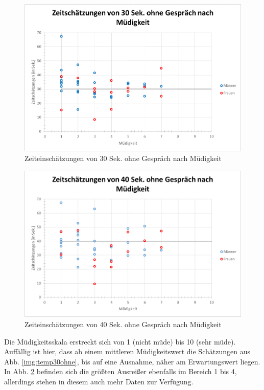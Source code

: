 \documentclass{Paper}
\begin{document}
\begin{figure}[H]
	\centering
	\includegraphics[scale=0.7]{../Diagramme/scatterPre/30ohne_muedigkeit.png}
	\caption{Zeiteinschätzungen von 30 Sek. ohne Gespräch nach Müdigkeit}
	\label{img:mued30ohne}
\end{figure}
\begin{figure}[H]
	\centering
	\includegraphics[scale=0.7]{../Diagramme/scatterPre/40ohne_muedigkeit.png}
	\caption{Zeiteinschätzungen von 40 Sek. ohne Gespräch nach Müdigkeit}
	\label{img:mued40ohne}
\end{figure}
Die Müdigkeitsskala erstreckt sich von 1 (nicht müde) bis 10 (sehr müde). Auffällig ist hier, dass ab einem mittleren Müdigkeitswert die Schätzungen aus Abb. \ref{img:temp30ohne}, bis auf eine Ausnahme, näher am Erwartungswert liegen. In Abb. \ref{img:mued40ohne} befinden sich die größten Ausreißer ebenfalls im Bereich 1 bis 4, allerdings stehen in diesem auch mehr Daten zur Verfügung.\\
\end{document}
